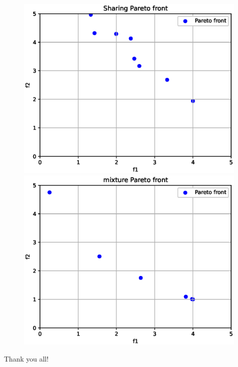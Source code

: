 \documentclass{beamer}
\begin{document}
\begin{frame}
\begin{figure}[htbp]
\begin{minipage}{0.49\linewidth}
			\includegraphics[scale=0.3]{sharing.eps}
			\centering
		\end{minipage}
		\begin{minipage}{0.49\linewidth}
			\includegraphics[scale=0.3]{mixture.eps}
			\centering
		\end{minipage}
	\end{figure}
\end{frame}
		
	
	

	

	
	\begin{frame}
		\Huge{\centerline{Thank you all!}}
	\end{frame}
	
\end{document}
